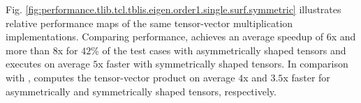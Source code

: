 Fig. \ref{fig:performance.tlib.tcl.tblis.eigen.order1.single.surf.symmetric} illustrates relative performance maps of the same tensor-vector multiplication implementations.
Comparing  performance,  achieves an average speedup of $6$x and more than $8$x for $42$\% of the test cases with asymmetrically shaped tensors and executes on average $5$x faster with symmetrically shaped tensors.
In comparison with ,  computes the tensor-vector product on average $4$x and $3.5$x faster for asymmetrically and symmetrically shaped tensors, respectively.






